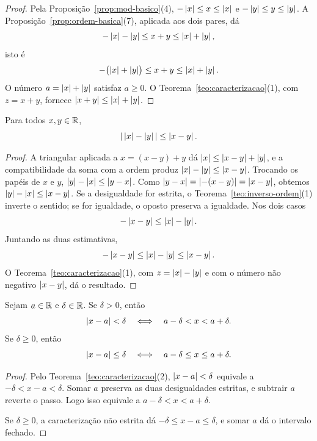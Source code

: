 \documentclass[11pt,a4paper]{article}
\begin{document}
\begin{proof}
Pela Proposição~\ref{prop:mod-basico}(4), $-\left\lvert x \right\rvert\le x\le\left\lvert x \right\rvert$ e $-\left\lvert y \right\rvert\le y\le\left\lvert y \right\rvert$. A Proposição~\ref{prop:ordem-basica}(7), aplicada aos dois pares, dá
\[
-\left\lvert x \right\rvert-\left\lvert y \right\rvert\le x+y\le\left\lvert x \right\rvert+\left\lvert y \right\rvert,
\]
isto é
\[
-\bigl(\left\lvert x \right\rvert+\left\lvert y \right\rvert\bigr)\le x+y\le\left\lvert x \right\rvert+\left\lvert y \right\rvert.
\]
O número $a=\left\lvert x \right\rvert+\left\lvert y \right\rvert$ satisfaz $a\ge 0$. O Teorema~\ref{teo:caracterizacao}(1), com $z=x+y$, fornece $\left\lvert x+y \right\rvert\le\left\lvert x \right\rvert+\left\lvert y \right\rvert$.
\end{proof}

\begin{corolario}\label{cor:diferenca-modulos}
Para todos $x,y\in\mathbb{R}$,
\[
\left\lvert \,\left\lvert x \right\rvert-\left\lvert y \right\rvert\, \right\rvert\le\left\lvert x-y \right\rvert.
\]
\end{corolario}

\begin{proof}
A triangular aplicada a $x=(x-y)+y$ dá $\left\lvert x \right\rvert\le\left\lvert x-y \right\rvert+\left\lvert y \right\rvert$, e a compatibilidade da soma com a ordem produz $\left\lvert x \right\rvert-\left\lvert y \right\rvert\le\left\lvert x-y \right\rvert$. Trocando os papéis de $x$ e $y$, $\left\lvert y \right\rvert-\left\lvert x \right\rvert\le\left\lvert y-x \right\rvert$. Como $\left\lvert y-x \right\rvert=\left\lvert -(x-y) \right\rvert=\left\lvert x-y \right\rvert$, obtemos $\left\lvert y \right\rvert-\left\lvert x \right\rvert\le\left\lvert x-y \right\rvert$. Se a desigualdade for estrita, o Teorema~\ref{teo:inverso-ordem}(1) inverte o sentido; se for igualdade, o oposto preserva a igualdade. Nos dois casos
\[
-\left\lvert x-y \right\rvert\le\left\lvert x \right\rvert-\left\lvert y \right\rvert.
\]
Juntando as duas estimativas,
\[
-\left\lvert x-y \right\rvert\le\left\lvert x \right\rvert-\left\lvert y \right\rvert\le\left\lvert x-y \right\rvert.
\]
O Teorema~\ref{teo:caracterizacao}(1), com $z=\left\lvert x \right\rvert-\left\lvert y \right\rvert$ e com o número não negativo $\left\lvert x-y \right\rvert$, dá o resultado.
\end{proof}

\begin{teorema}\label{teo:vizinhanca}
Sejam $a\in\mathbb{R}$ e $\delta\in\mathbb{R}$. Se $\delta>0$, então
\[
\left\lvert x-a \right\rvert<\delta\quad\Longleftrightarrow\quad a-\delta<x<a+\delta.
\]
Se $\delta\ge 0$, então
\[
\left\lvert x-a \right\rvert\le\delta\quad\Longleftrightarrow\quad a-\delta\le x\le a+\delta.
\]
\end{teorema}

\begin{proof}
Pelo Teorema~\ref{teo:caracterizacao}(2), $\left\lvert x-a \right\rvert<\delta$ equivale a $-\delta<x-a<\delta$. Somar $a$ preserva as duas desigualdades estritas, e subtrair $a$ reverte o passo. Logo isso equivale a $a-\delta<x<a+\delta$.

Se $\delta\ge 0$, a caracterização não estrita dá $-\delta\le x-a\le\delta$, e somar $a$ dá o intervalo fechado.
\end{proof}
\end{document}
